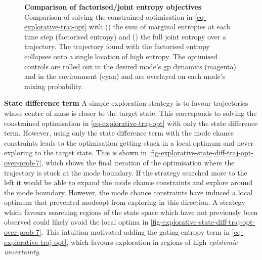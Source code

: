 \documentclass{mimosis-class/mimosis}
\numberwithin{equation}{chapter}
\begin{document}
{\begin{figure}
\caption[Comparison of factorised/joint entropy objectives]{\textbf{Comparison of factorised/joint entropy objectives}
Comparison of solving the constrained optimisation in \cref{eq-explorative-traj-opt} with
()
the sum of marginal entropies at each time step (factorised entropy) and
()
the full joint entropy over a trajectory.
The trajectory found with the factorised entropy collapses onto a single location of high entropy.
The optimised controls are rolled out in the desired mode’s
\acrshort{gp} dynamics (magenta) and in the environment (cyan) and are overlayed on each mode’s mixing probability.}
\label{fig-entropy-comparison-traj-opt-7}
\end{figure}
\newline

\textbf{State difference term}
A simple exploration strategy is to favour trajectories whose centre of mass is closer to the target state.
This corresponds to solving the constrained optimisation in \cref{eq-explorative-traj-opt}
with only the state difference term.
However, using only the state difference term with the mode chance constraints leads to the optimisation getting
stuck in a local optimum and never exploring to the target state.
This is shown in \cref{fig-explorative-state-diff-traj-opt-over-prob-7}, which shows the final iteration of the
optimisation where the trajectory is stuck at the mode boundary.
If the strategy searched more to the left it would be able to expand
the mode chance constraints and explore around the mode boundary.
However, the mode chance constraints have induced a local optimum that prevented \acrshort{modeopt}
from exploring in this direction.
A strategy which favours searching regions of the state space which have not previously been observed
could likely avoid the local optima in \cref{fig-explorative-state-diff-traj-opt-over-prob-7}.
This intuition motivated adding the gating entropy term in \cref{eq-explorative-traj-opt}, which favours exploration in
regions of high \emph{epistemic uncertainty}.

}
\end{document}
